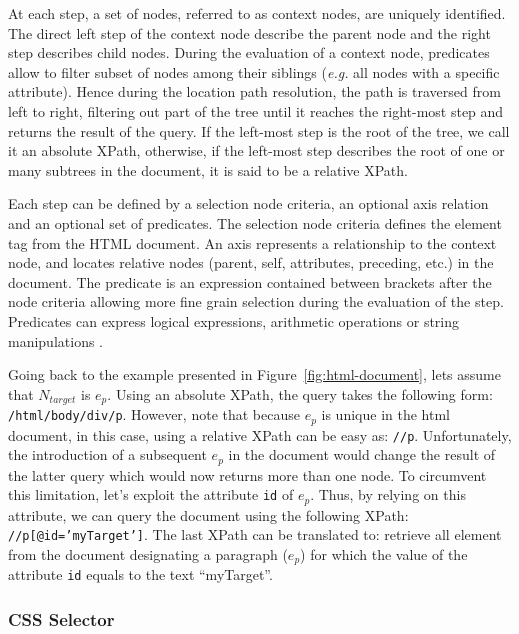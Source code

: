 At each step, a set of nodes, referred to as context nodes, are uniquely identified. The direct left step of the context node describe the parent node and the right step describes child nodes. During the evaluation of a context node, predicates allow to filter subset of nodes among their siblings (\emph{e.g.} all nodes with a specific attribute). Hence during the location path resolution, the path is traversed from left to right, filtering out part of the tree until it reaches the right-most step and returns the result of the query. If the left-most step is the root of the tree, we call it an absolute XPath, otherwise, if the left-most step describes the root of one or many subtrees in the document, it is said to be a relative XPath. 

Each step can be defined by a selection node criteria, an optional axis relation and an optional set of predicates\cite{Barton2003}. The selection node criteria defines the element tag from the HTML document. An axis represents a relationship to the context node, and locates relative nodes (parent, self, attributes, preceding, etc.) in the document. The predicate is an expression contained between brackets after the node criteria allowing more fine grain selection during the evaluation of the step. Predicates can express logical expressions, arithmetic operations or string manipulations \cite{Gottlob2005}.

Going back to the example presented in Figure~\ref{fig:html-document}, lets assume that $N_{target}$ is $e_{p}$. Using an absolute XPath, the query takes the following form: \texttt{/html/body/div/p}. However, note that because $e_p$ is unique in the \gls{html} document, in this case, using a relative XPath can be easy as: \texttt{//p}. Unfortunately, the introduction of a subsequent $e_p$ in the document would change the result of the latter query which would now returns more than one node. To circumvent this limitation, let's exploit the  attribute \texttt{id} of $e_p$. Thus, by relying on this attribute, we can query the document using the following XPath: \texttt{//p[@id='myTarget']}. The last XPath can be translated to: retrieve all element from the document designating a paragraph ($e_p$) for which the value of the attribute \texttt{id} equals to the text ``myTarget''.

\subsubsection{CSS Selector}
\label{sec:hpath-introduction-css-selector}

